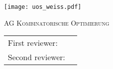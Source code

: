 \makeatletter
\begin{titlepage}
  \begin{center}
    \texttt{[image: uos\_weiss.pdf]}

    \vspace{-5mm}

    {\large \textsc{AG Kombinatorische Optimierung}} 

    \vspace{1cm}

    {\LARGE \textbf{\ThesisType{}}}

    \vspace{2.5cm}

    {\Huge\bfseries
      \@title
    }

    \vspace{3.5cm}

    {\Large \@author}

    \vspace{5mm}

    {\Large \@date}

		\vfill
		\begin{tabular}{ll}
		  \large First reviewer:  & \large \ThesisSupFst{}\\[3mm]
		  \large Second reviewer: & \large \ThesisSupSnd{}
		\end{tabular}
  \end{center}
\end{titlepage}
\makeatother
